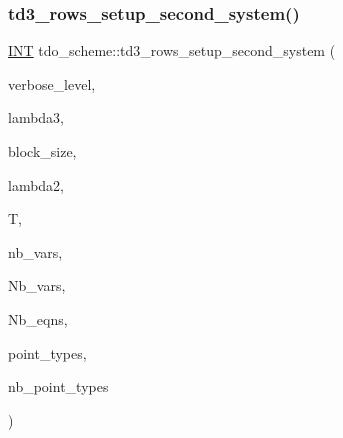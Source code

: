 \subsubsection{\texorpdfstring{td3\+\_\+rows\+\_\+setup\+\_\+second\+\_\+system()}{td3\_rows\_setup\_second\_system()}}
{\footnotesize\ttfamily \mbox{\hyperlink{galois_8h_a09fddde158a3a20bd2dcadb609de11dc}{I\+NT}} tdo\+\_\+scheme\+::td3\+\_\+rows\+\_\+setup\+\_\+second\+\_\+system (\begin{DoxyParamCaption}\item[{\mbox{\hyperlink{galois_8h_a09fddde158a3a20bd2dcadb609de11dc}{I\+NT}}}]{verbose\+\_\+level,  }\item[{\mbox{\hyperlink{galois_8h_a09fddde158a3a20bd2dcadb609de11dc}{I\+NT}}}]{lambda3,  }\item[{\mbox{\hyperlink{galois_8h_a09fddde158a3a20bd2dcadb609de11dc}{I\+NT}}}]{block\+\_\+size,  }\item[{\mbox{\hyperlink{galois_8h_a09fddde158a3a20bd2dcadb609de11dc}{I\+NT}}}]{lambda2,  }\item[{\mbox{\hyperlink{classtdo__data}{tdo\+\_\+data}} \&}]{T,  }\item[{\mbox{\hyperlink{galois_8h_a09fddde158a3a20bd2dcadb609de11dc}{I\+NT}}}]{nb\+\_\+vars,  }\item[{\mbox{\hyperlink{galois_8h_a09fddde158a3a20bd2dcadb609de11dc}{I\+NT}} \&}]{Nb\+\_\+vars,  }\item[{\mbox{\hyperlink{galois_8h_a09fddde158a3a20bd2dcadb609de11dc}{I\+NT}} \&}]{Nb\+\_\+eqns,  }\item[{\mbox{\hyperlink{galois_8h_a09fddde158a3a20bd2dcadb609de11dc}{I\+NT}} $\ast$\&}]{point\+\_\+types,  }\item[{\mbox{\hyperlink{galois_8h_a09fddde158a3a20bd2dcadb609de11dc}{I\+NT}} \&}]{nb\+\_\+point\+\_\+types }\end{DoxyParamCaption})}

\mbox{\label{classtdo__scheme_a78bb155293588565c1b4398453b5e398}} 
